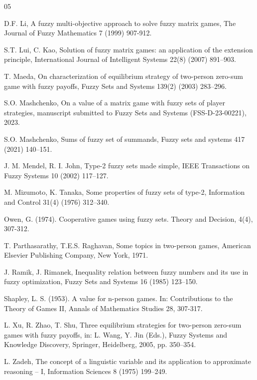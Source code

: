 \documentclass[14pt, a4paper, oneside]{extarticle}
\numberwithin{equation}{section}
\begin{document}
\begin{thebibliography}{05}
{ D.F. Li, A fuzzy multi-objective approach to solve fuzzy matrix games, The Journal of Fuzzy Mathematics 7 (1999) 907-912.

 S.T. Lui, C. Kao, Solution of fuzzy matrix games: an application of the extension principle, International Journal of Intelligent Systems 22(8) (2007) 891–903.

 T. Maeda, On characterization of equilibrium strategy of two-person zero-sum game with fuzzy payoffs, Fuzzy Sets and Systems 139(2) (2003) 283–296.

 S.O. Mashchenko, On a value of a matrix game with fuzzy sets of player strategies, manuscript submitted to Fuzzy Sets and Systems (FSS-D-23-00221), 2023.

 S.O. Mashchenko, Sums of fuzzy set of summands, Fuzzy sets and systems 417 (2021) 140–151.

 J. M. Mendel, R. I. John, Type-2 fuzzy sets made simple, IEEE Transactions on Fuzzy Systems 10 (2002) 117–127.

 M. Mizumoto, K. Tanaka, Some properties of fuzzy sets of type-2, Information and Control 31(4) (1976) 312–340.

 Owen, G. (1974). Cooperative games using fuzzy sets. Theory and Decision, 4(4), 307-312.

 T. Parthasarathy, T.E.S. Raghavan, Some topics in two-person games, American Elsevier Publishing Company, New York, 1971.

 J. Ramik, J. Rimanek, Inequality relation between fuzzy numbers and its use in fuzzy optimization, Fuzzy Sets and Systems 16 (1985) 123–150.

 Shapley, L. S. (1953). A value for n-person games. In: Contributions to the Theory of Games II, Annals of Mathematics Studies 28, 307-317.

 L. Xu, R. Zhao, T. Shu, Three equilibrium strategies for two-person zero-sum games with fuzzy payoffs, in: L. Wang, Y. Jin (Eds.), Fuzzy Systems and Knowledge Discovery, Springer, Heidelberg, 2005, pp. 350–354.

 L. Zadeh, The concept of a linguistic variable and its application to approximate reasoning – I, Information Sciences 8 (1975) 199–249.


}
\end{thebibliography}
\end{document}
